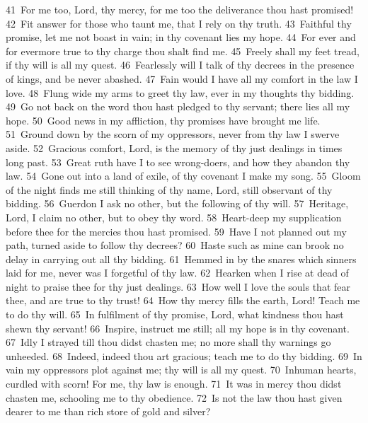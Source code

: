 \documentclass[10pt]{book} %
\begin{document}
\textcolor{benred8}{41}~For me too, Lord, thy mercy, for me too the deliverance thou hast promised! \textcolor{benred8}{42}~Fit answer for those who taunt me, that I rely on thy truth. \textcolor{benred8}{43}~Faithful thy promise, let me not boast in vain; in thy covenant lies my hope. \textcolor{benred8}{44}~For ever and for evermore true to thy charge thou shalt find me. \textcolor{benred8}{45}~Freely shall my feet tread, if thy will is all my quest. \textcolor{benred8}{46}~Fearlessly will I talk of thy decrees in the presence of kings, and be never abashed. \textcolor{benred8}{47}~Fain would I have all my comfort in the law I love. \textcolor{benred8}{48}~Flung wide my arms to greet thy law, ever in my thoughts thy bidding.
\textcolor{benred8}{49}~Go not back on the word thou hast pledged to thy servant; there lies all my hope. \textcolor{benred8}{50}~Good news in my affliction, thy promises have brought me life. \textcolor{benred8}{51}~Ground down by the scorn of my oppressors, never from thy law I swerve aside. \textcolor{benred8}{52}~Gracious comfort, Lord, is the memory of thy just dealings in times long past. \textcolor{benred8}{53}~Great ruth have I to see wrong-doers, and how they abandon thy law. \textcolor{benred8}{54}~Gone out into a land of exile, of thy covenant I make my song. \textcolor{benred8}{55}~Gloom of the night finds me still thinking of thy name, Lord, still observant of thy bidding. \textcolor{benred8}{56}~Guerdon I ask no other, but the following of thy will.
\textcolor{benred8}{57}~Heritage, Lord, I claim no other, but to obey thy word. \textcolor{benred8}{58}~Heart-deep my supplication before thee for the mercies thou hast promised. \textcolor{benred8}{59}~Have I not planned out my path, turned aside to follow thy decrees? \textcolor{benred8}{60}~Haste such as mine can brook no delay in carrying out all thy bidding. \textcolor{benred8}{61}~Hemmed in by the snares which sinners laid for me, never was I forgetful of thy law. \textcolor{benred8}{62}~Hearken when I rise at dead of night to praise thee for thy just dealings. \textcolor{benred8}{63}~How well I love the souls that fear thee, and are true to thy trust! \textcolor{benred8}{64}~How thy mercy fills the earth, Lord! Teach me to do thy will.
\textcolor{benred8}{65}~In fulfilment of thy promise, Lord, what kindness thou hast shewn thy servant! \textcolor{benred8}{66}~Inspire, instruct me still; all my hope is in thy covenant. \textcolor{benred8}{67}~Idly I strayed till thou didst chasten me; no more shall thy warnings go unheeded. \textcolor{benred8}{68}~Indeed, indeed thou art gracious; teach me to do thy bidding. \textcolor{benred8}{69}~In vain my oppressors plot against me; thy will is all my quest. \textcolor{benred8}{70}~Inhuman hearts, curdled with scorn! For me, thy law is enough. \textcolor{benred8}{71}~It was in mercy thou didst chasten me, schooling me to thy obedience. \textcolor{benred8}{72}~Is not the law thou hast given dearer to me than rich store of gold and silver?
\end{document}
